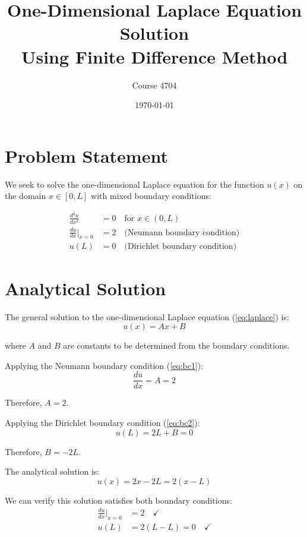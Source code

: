 \documentclass[11pt,a4paper]{article}
\title{One-Dimensional Laplace Equation Solution \\
       Using Finite Difference Method}
\author{Course 4704}
\date{\today}
\begin{document}
\maketitle

\section{Problem Statement}

We seek to solve the one-dimensional Laplace equation for the function $u(x)$ on the domain $x \in [0, L]$ with mixed boundary conditions:

\begin{align}
\frac{d^2u}{dx^2} &= 0 \quad \text{for } x \in (0, L) \label{eq:laplace} \\
\frac{du}{dx}\bigg|_{x=0} &= 2 \quad \text{(Neumann boundary condition)} \label{eq:bc1} \\
u(L) &= 0 \quad \text{(Dirichlet boundary condition)} \label{eq:bc2}
\end{align}

\section{Analytical Solution}

The general solution to the one-dimensional Laplace equation (\ref{eq:laplace}) is:
\begin{equation}
u(x) = Ax + B
\end{equation}

where $A$ and $B$ are constants to be determined from the boundary conditions.

Applying the Neumann boundary condition (\ref{eq:bc1}):
\begin{equation}
\frac{du}{dx} = A = 2
\end{equation}

Therefore, $A = 2$.

Applying the Dirichlet boundary condition (\ref{eq:bc2}):
\begin{equation}
u(L) = 2L + B = 0
\end{equation}

Therefore, $B = -2L$.

The analytical solution is:
\begin{equation}
u(x) = 2x - 2L = 2(x - L) \label{eq:analytical}
\end{equation}

We can verify this solution satisfies both boundary conditions:
\begin{align}
\frac{du}{dx}\bigg|_{x=0} &= 2 \quad \checkmark \\
u(L) &= 2(L - L) = 0 \quad \checkmark
\end{align}
\end{document}
